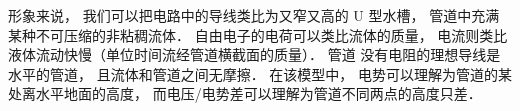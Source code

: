 
形象来说， 我们可以把电路中的导线类比为又窄又高的 U 型水槽， 管道中充满某种不可压缩的非粘稠流体． 自由电子的电荷可以类比流体的质量， 电流则类比液体流动快慢（单位时间流经管道横截面的质量）． 管道  没有电阻的理想导线是水平的管道， 且流体和管道之间无摩擦． 在该模型中， 电势可以理解为管道的某处离水平地面的高度， 而电压/电势差可以理解为管道不同两点的高度只差．
